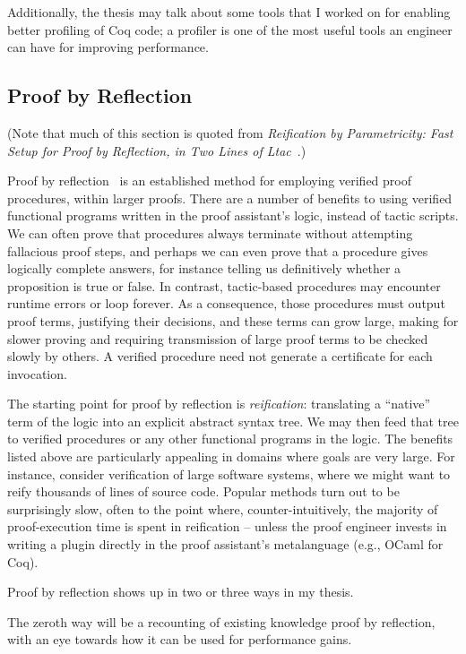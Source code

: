 \documentclass[twoside]{article}
\begin{document}
Additionally, the thesis may talk about some tools that I worked on for enabling better profiling of Coq code; a profiler is one of the most useful tools an engineer can have for improving performance.

\subsection{Proof by Reflection} \label{sec:proof-by-reflection}

(Note that much of this section is quoted from \emph{Reification by Parametricity: Fast Setup for Proof by Reflection, in Two Lines of {L}tac}~\cite{reification-by-parametricity}.)

Proof by reflection~\cite{ReflectionTACS97} is an established method for employing verified proof procedures, within larger proofs.
There are a number of benefits to using verified functional programs written in the proof assistant's logic, instead of tactic scripts.
We can often prove that procedures always terminate without attempting fallacious proof steps, and perhaps we can even prove that a procedure gives logically complete answers, for instance telling us definitively whether a proposition is true or false.
In contrast, tactic-based procedures may encounter runtime errors or loop forever.
As a consequence, those procedures must output proof terms, justifying their decisions, and these terms can grow large, making for slower proving and requiring transmission of large proof terms to be checked slowly by others.
A verified procedure need not generate a certificate for each invocation.

The starting point for proof by reflection is \emph{reification}: translating a ``native'' term of the logic into an explicit abstract syntax tree.
We may then feed that tree to verified procedures or any other functional programs in the logic.
The benefits listed above are particularly appealing in domains where goals are very large.
For instance, consider verification of large software systems, where we might want to reify thousands of lines of source code.
Popular methods turn out to be surprisingly slow, often to the point where, counter-intuitively, the majority of proof-execution time is spent in reification -- unless the proof engineer invests in writing a plugin directly in the proof assistant's metalanguage (e.g., OCaml for Coq).

Proof by reflection shows up in two or three ways in my thesis.

The zeroth way will be a recounting of existing knowledge proof by reflection, with an eye towards how it can be used for performance gains.
\end{document}
